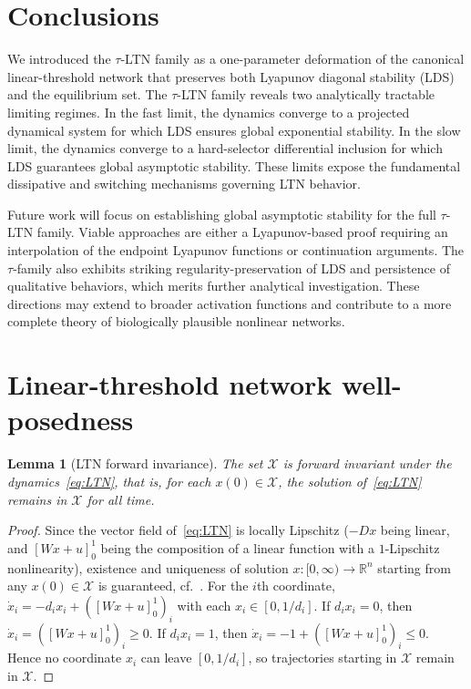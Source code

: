 \documentclass[letterpaper, conference]{ieeeconf}
\newcommand{\R}{\mathbb R}
\newcommand{\X}{\mathcal X}
\newtheorem{lemma}[theorem]{Lemma}
\newcommand{\1}{\mathbf{1}}
\begin{document}
\section{Conclusions}




We introduced the \(\tau\)-LTN family as a one-parameter deformation of the canonical linear-threshold network that preserves both Lyapunov diagonal stability (LDS) and the equilibrium set. The \(\tau\)-LTN family reveals two analytically tractable limiting regimes. In the fast limit, the dynamics converge to a projected dynamical system for which LDS ensures global exponential stability. In the slow limit, the dynamics converge to a hard-selector differential inclusion for which LDS guarantees global asymptotic stability. These limits expose the fundamental dissipative and switching mechanisms governing LTN behavior.

Future work will focus on establishing global asymptotic stability for the full \(\tau\)-LTN family. Viable approaches are either a Lyapunov-based proof requiring an interpolation of the endpoint Lyapunov functions or continuation arguments. The \(\tau\)-family also exhibits striking regularity-preservation of LDS and persistence of qualitative behaviors, which merits further analytical investigation. These directions may extend to broader activation functions and contribute to a more complete theory of biologically plausible nonlinear networks.


\appendices
{}
\renewcommand{\thetheorem}{A\thesection.\arabic{theorem}}

\section{Linear-threshold network well-posedness}
\begin{lemma}[LTN forward invariance]
\label{lem:forward_invariance}
The set \(\X\) is forward invariant under the dynamics~\eqref{eq:LTN}, that is, for each \(x(0) \in \X\), the solution of~\eqref{eq:LTN} remains in \(\X\) for all time.
\end{lemma}
\begin{proof}
Since the vector field of~\eqref{eq:LTN} is locally Lipschitz (\(-Dx\) being linear, and \([Wx + u]_0^1\) being the composition of a linear function with a \(1\)-Lipschitz nonlinearity), existence and uniqueness of solution \(x:[0, \infty) \rightarrow \R^n\) starting from any \(x(0) \in \X\) is guaranteed, cf.~\cite{HK:02}.
For the \(i\)th coordinate, \( \dot x_i= -d_ix_i+\left([Wx+u]_0^1\right)_i\) with each \(x_i \in [0,1/d_i]\). If \(d_ix_i=0\), then \( \dot x_i= \left([Wx+u]_0^1\right)_i\ge0\). 
If \(d_ix_i=1\), then \( \dot x_i= -1+\left([Wx+u]_0^1\right)_i\le0\). Hence no coordinate \(x_i\) can leave \([0,1/d_i]\), so trajectories starting in \(\X\) remain in \(\X\).
\end{proof}

\smallskip
%

\end{document}
